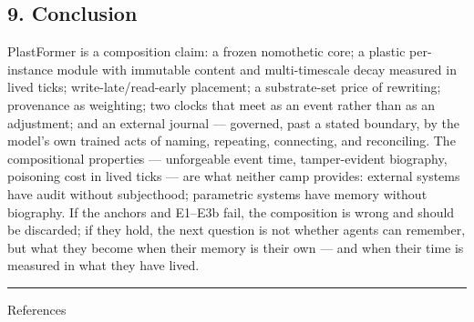 \documentclass[
]{article}
\begin{document}
\subsection{9. Conclusion}\label{conclusion}

PlastFormer is a composition claim: a frozen nomothetic core; a plastic
per-instance module with immutable content and multi-timescale decay
measured in lived ticks; write-late/read-early placement; a
substrate-set price of rewriting; provenance as weighting; two clocks
that meet as an event rather than as an adjustment; and an external
journal --- governed, past a stated boundary, by the model's own trained
acts of naming, repeating, connecting, and reconciling. The
compositional properties --- unforgeable event time, tamper-evident
biography, poisoning cost in lived ticks --- are what neither camp
provides: external systems have audit without subjecthood; parametric
systems have memory without biography. If the anchors and E1--E3b fail,
the composition is wrong and should be discarded; if they hold, the next
question is not whether agents can remember, but what they become when
their memory is their own --- and when their time is measured in what
they have lived.

\begin{center}\rule{0.5\linewidth}{0.5pt}\end{center}

References
\end{document}
